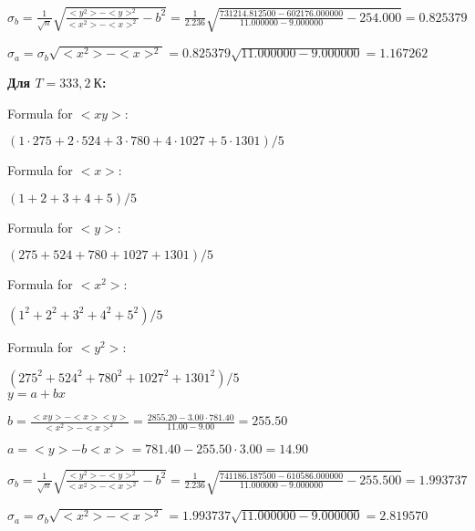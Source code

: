 \documentclass[12pt,a4paper]{article}
\begin{document}
$\sigma_b = \frac{1}{\sqrt{n}} \sqrt { \frac{<y^2> - <y>^2}{<x^2> - <x>^2}  - b^2} = \frac{1}{2.236} \sqrt {\frac{731214.812500 - 602176.000000}{11.000000 - 9.000000} - 254.000} = 0.825379$
\vspace{0.5cm}

$\sigma_a = \sigma_b \sqrt{<x^2> - <x>^2} = 0.825379 \sqrt{11.000000 - 9.000000} = 1.167262$
\vspace{0.5cm}





\textbf{Для $T = 333,2 \: \textit{К}$:}
\vspace{0.5cm}



Formula for $<xy>:$
\vspace{0.5cm}

$(1 \cdot 275 + 2 \cdot 524 + 3 \cdot 780 + 4 \cdot 1027 + 5 \cdot 1301) / 5$
\vspace{0.5cm}

Formula for $<x>:$
\vspace{0.5cm}

$(1 + 2 + 3 + 4 + 5) / 5$
\vspace{0.5cm}

Formula for $<y>:$
\vspace{0.5cm}

$(275 + 524 + 780 + 1027 + 1301) / 5$
\vspace{0.5cm}

Formula for $<x^2>$:
\vspace{0.5cm}

$(1^2 + 2^2 + 3^2 + 4^2 + 5^2) / 5$
\vspace{0.5cm}

Formula for $<y^2>:$
\vspace{0.5cm}

$(275^2 + 524^2 + 780^2 + 1027^2 + 1301^2) / 5$
\vspace{0.5cm}\\



$y = a + bx$
\vspace{0.5cm}

$b = \frac{<xy> - <x><y>}{<x^2> - <x>^2} = \frac{2855.20 - 3.00 \cdot 781.40}{11.00 - 9.00} = 255.50$
\vspace{0.5cm}

$a =<y> - b<x> = 781.40 - 255.50 \cdot 3.00 = 14.90$
\vspace{0.5cm}

$\sigma_b = \frac{1}{\sqrt{n}} \sqrt { \frac{<y^2> - <y>^2}{<x^2> - <x>^2}  - b^2} = \frac{1}{2.236} \sqrt {\frac{741186.187500 - 610586.000000}{11.000000 - 9.000000} - 255.500} = 1.993737$
\vspace{0.5cm}

$\sigma_a = \sigma_b \sqrt{<x^2> - <x>^2} = 1.993737 \sqrt{11.000000 - 9.000000} = 2.819570$
\vspace{0.5cm}
\end{document}
